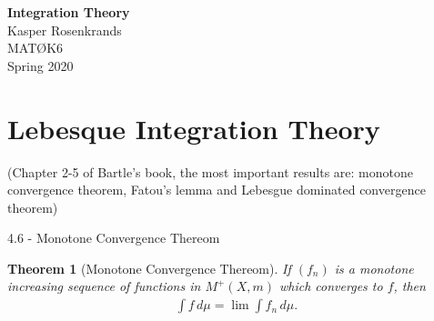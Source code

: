 \documentclass{article}
\newtheorem{theorem}{Theorem}[section]
\numberwithin{equation}{section}
\begin{document}
\thispagestyle{empty}
\begin{center}
{\huge\textbf{Integration Theory}}\\[2mm]
{\Large Kasper Rosenkrands}\\[2cm]
{\large MATØK6}\\[2mm]
{\large Spring 2020}
\end{center}

\newpage


\section{Lebesque Integration Theory}
(Chapter 2-5 of Bartle's book, the most important results are: monotone convergence theorem, Fatou's lemma and Lebesgue dominated convergence theorem)

4.6 - Monotone Convergence Thereom

\begin{theorem}[Monotone Convergence Thereom]
    If $(f_n)$ is a monotone increasing sequence of functions in $M^+(X,m)$ which converges to $f$, then
    \begin{align}\label{eq:b4.6}
        \int f \,d\mu = \lim \int f_n  \,d\mu. 
    \end{align}
\end{theorem}
\end{document}

